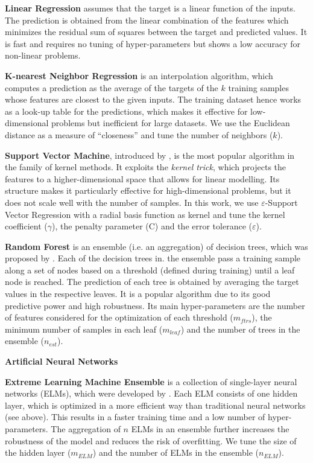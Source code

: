 \textbf{Linear Regression }assumes that the target is a linear function of the inputs. The prediction is obtained from the linear combination of the features which minimizes the residual sum of squares between the target and predicted values. It is fast and requires no tuning of hyper-parameters but shows a low accuracy for non-linear problems.

\textbf{K-nearest Neighbor Regression} is an interpolation algorithm, which computes a prediction as the average of the targets of the $k$ training samples whose features are closest to the given inputs. The training dataset hence works as a look-up table for the predictions, which makes it effective for low-dimensional problems but inefficient for large datasets. We use the Euclidean distance as a measure of “closeness” and tune the number of neighbors ($k$).

\textbf{Support Vector Machine}, introduced by \citet{cortes_support-vector_1995}, is the most popular algorithm in the family of kernel methods. It exploits the \textit{kernel trick}, which projects the features to a higher-dimensional space that allows for linear modelling. Its structure makes it particularly effective for high-dimensional problems, but it does not scale well with the number of samples. In this work, we use $\varepsilon$-Support Vector Regression with a radial basis function as kernel and tune the kernel coefficient ($\gamma$), the penalty parameter (C) and the error tolerance ($\varepsilon$).

\textbf{Random Forest} is an ensemble (i.e. an aggregation) of decision trees, which was proposed by \citet{breiman_random_2001}. Each of the decision trees in. the ensemble pass a training sample along a set of nodes based on a threshold (defined during training) until a leaf node is reached. The prediction of each tree is obtained by averaging the target values in the respective leaves. It is a popular algorithm due to its good predictive power and high robustness. Its main hyper-parameters are the number of features considered for the optimization of each threshold ($m_{ftrs}$), the minimum number of samples in each leaf ($m_{leaf}$) and the number of trees in the ensemble ($n_{est}$).

\textbf{Artificial Neural Networks}

\textbf{Extreme Learning Machine Ensemble } is a collection of single-layer neural networks (ELMs), which were developed by \citet{huang_extreme_2006}. Each ELM consists of one hidden layer, which is optimized in a more efficient way than traditional neural networks (see above). This results in a faster training time and a low number of hyper-parameters. The aggregation of $n$ ELMs in an ensemble further increases the robustness of the model and reduces the risk of overfitting. We tune the size of the hidden layer ($m_{ELM}$) and the number of ELMs in the ensemble ($n_{ELM}$).

